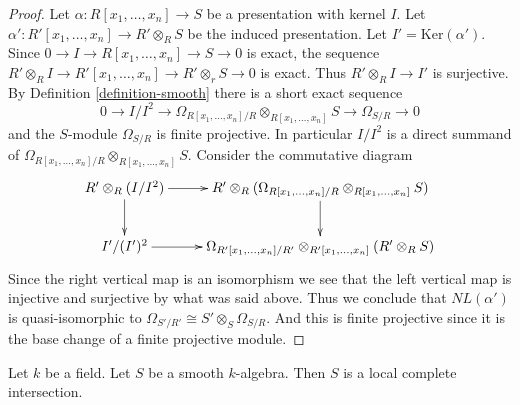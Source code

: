 \begin{proof}
Let $\alpha : R[x_1, \ldots, x_n] \to S$ be a presentation
with kernel $I$. Let $\alpha' : R'[x_1, \ldots, x_n] \to R' \otimes_R S$
be the induced presentation. Let $I' = \text{Ker}(\alpha')$.
Since $0 \to I \to R[x_1, \ldots, x_n] \to S \to 0$
is exact, the sequence
$R' \otimes_R I \to R'[x_1, \ldots, x_n] \to R' \otimes_r S \to 0$
is exact. Thus $R' \otimes_R I \to I'$ is surjective.
By Definition \ref{definition-smooth} there is a short exact sequence
$$
0 \to I/I^2 \to
\Omega_{R[x_1, \ldots, x_n]/R} \otimes_{R[x_1, \ldots, x_n]} S \to
\Omega_{S/R} \to
0
$$
and the $S$-module $\Omega_{S/R}$ is finite projective.
In particular $I/I^2$ is a direct summand of
$\Omega_{R[x_1, \ldots, x_n]/R} \otimes_{R[x_1, \ldots, x_n]} S$.
Consider the commutative diagram
$$
\xymatrix{
R' \otimes_R (I/I^2) \ar[r] \ar[d] &
R' \otimes_R (\Omega_{R[x_1, \ldots, x_n]/R} \otimes_{R[x_1, \ldots, x_n]} S)
\ar[d] \\
I'/(I')^2 \ar[r] &
\Omega_{R'[x_1, \ldots, x_n]/R'}
\otimes_{R'[x_1, \ldots, x_n]} (R' \otimes_R S)
}
$$
Since the right vertical map is an isomorphism we see that
the left vertical map is injective and surjective by what was
said above. Thus we conclude that $NL(\alpha')$ is quasi-isomorphic
to $\Omega_{S'/R'} \cong S' \otimes_S \Omega_{S/R}$.
And this is finite projective since it is the base change
of a finite projective module.
\end{proof}

\begin{lemma}
\label{lemma-smooth-over-field}
Let $k$ be a field.
Let $S$ be a smooth $k$-algebra.
Then $S$ is a local complete intersection.
\end{lemma}

